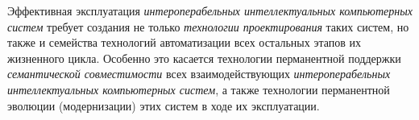 Эффективная эксплуатация \textit{интероперабельных интеллектуальных компьютерных систем} требует создания не только \textit{технологии проектирования} таких систем, но также и семейства технологий автоматизации всех остальных этапов их жизненного цикла. Особенно это касается технологии перманентной поддержки \textit{семантической совместимости} всех взаимодействующих \textit{интероперабельных интеллектуальных компьютерных систем}, а также технологии перманентной эволюции (модернизации) этих систем в ходе их эксплуатации.

%
